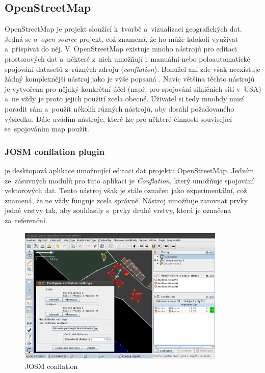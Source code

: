 \subsection{OpenStreetMap}
\label{OSM}

OpenStreetMap je projekt sloužící k~tvorbě a~vizualizaci geografických dat.
Jedná se o~\textit{open source} projekt, což znamená, že ho může kdokoli 
využívat a~přispívat do něj. V~OpenStreetMap existuje mnoho nástrojů 
pro editaci prostorových dat a~některé z~nich umožňují i~manuální nebo
poloautomatické spojování datasetů z~různých zdrojů (\textit{conflation}). 
Bohužel ani zde však neexistuje žádný komplexnější nástroj jako je výše
popsaná . Navíc většina těchto nástrojů je vytvořena pro nějaký
konkrétní účel (např. pro spojování silničních sítí v~USA) a~ne vždy
je proto jejich použití zcela obecné. Uživatel si tedy mnohdy musí poradit
sám a~použít několik různých nástrojů, aby dosáhl požadovaného výsledku.
Dále uvádím nástroje, které lze pro některé činnosti související 
se~spojováním map použít. 

\subsubsection{JOSM conflation plugin}

 je desktopová aplikace umožnující
editaci dat projektu OpenStreetMap. Jedním ze~zásuvných modulů pro tuto 
aplikaci je \textit{Conflation}, který umožňuje spojování vektorových dat. 
Tento nástroj však je stále označen jako experimentální, což znamená, že ne 
vždy funguje zcela správně. Nástroj umožňuje zarovnat prvky jedné vrstvy tak,
aby souhlasily s~prvky druhé vrstvy, která je označena za~referenční. 

  \begin{figure}[hbt]
    \centering
      \includegraphics[width=280pt]{./pictures/josm.png}
      \caption{JOSM conflation}
      \label{fig:josm}
  \end{figure} 

